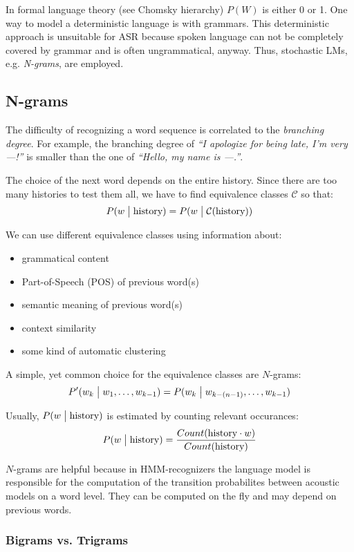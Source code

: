 In formal language theory (see Chomsky hierarchy) $P(W)$ is either 0 or 1. One way to model a deterministic language is with grammars. This deterministic approach is unsuitable for ASR because spoken language can not be completely covered by grammar and is often ungrammatical, anyway. Thus, stochastic LMs, e.g. \emph{N-grams}, are employed.

\subsection{N-grams}

The difficulty of recognizing a word sequence is correlated to the \textit{branching degree}. For example, the branching degree of \textit{``I apologize for being late, I'm very ---!''} is smaller than the one of \textit{``Hello, my name is ---.''}.

The choice of the next word depends on the entire history. Since there are too many histories to test them all, we have to find equivalence classes $\mathcal{C}$ so that:
\[
    P(w \bigm| \mbox{history}) = P(w \bigm| \mathcal{C}(\mbox{history}))
\]

We can use different equivalence classes using information about:
\begin{itemize}
\item grammatical content
\item Part-of-Speech (POS) of previous word(s)
\item semantic meaning of previous word(s)
\item context similarity
\item some kind of automatic clustering
\end{itemize}

A simple, yet common choice for the equivalence classes are $N$-grams:
\[
    P'(w_k \bigm| w_1, \ldots, w_{k-1}) = P(w_k \bigm| w_{k - (n - 1)}, \ldots, w_{k-1})
\]

Usually, $P(w \bigm| \mbox{history})$ is estimated by counting relevant occurances:
\[
    P(w \bigm| \mbox{history}) = \frac{Count(\mbox{history} \cdot w)}{Count(\mbox{history})}
\]

$N$-grams are helpful because in HMM-recognizers the language model is responsible for the computation of the transition probabilites between acoustic models on a word level.
They can be computed on the fly and may depend on previous words.

\subsubsection{Bigrams vs. Trigrams}

